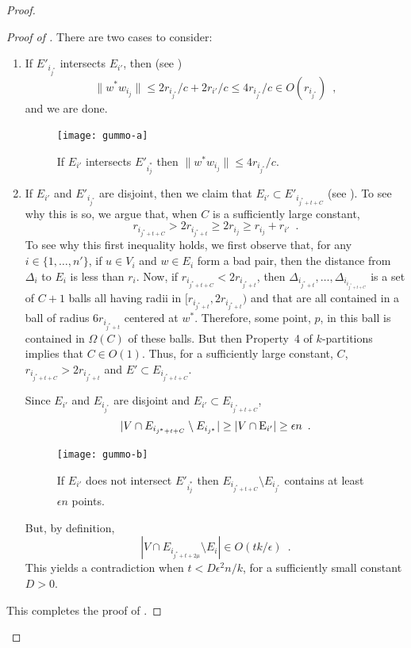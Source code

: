 \documentclass{patmorin}
\begin{document}
\begin{proof}
\begin{proof}[Proof of ]
  There are two cases to consider:
  \begin{enumerate}
    \item 
    If $E'_{i_{j^*}}$ intersects $E_{i'}$, then (see )
    \[
       \|w^*w_{i_j}\|\le 2r_{i_{j^*}}/c + 2r_{i'}/c \le 4r_{i_{j^*}}/c \in O(r_{i_{j^*}}) \enspace ,
    \]
    and we are done. 
    \begin{figure}
      \begin{center}
        \texttt{[image: gummo-a]}
        \caption{If $E_{i'}$ intersects $E'_{i_j^*}$ then $\|w^*w_{i_j}\|\le 4r_{i_{j^*}}/c$.}
      \end{center}
    \end{figure}
  
    \item If $E_{i'}$ and $E'_{i_{j^*}}$ are disjoint, then we claim that
    $E_{i'}\subset E'_{i_{j^*+t+C}}$ (see ).  To see why
    this is so, we argue that, when $C$ is a sufficiently large constant,
    \[
      r_{i_{j^*+t+C}} > 2r_{i_{j^*+t}} 
          \ge 2r_{i_j} \ge r_{i_j} + r_{i'} \enspace .
    \]  
    To see why this first inequality holds, we first observe
    that, for any $i\in\{1,\ldots,n'\}$, if $u\in V_i$ and $w\in E_i$
    form a bad pair, then the distance from $\Delta_i$ to $E_i$ is less
    than $r_i$.  Now, if $r_{i_{j^*+t+C}} < 2r_{i_{j^*+t}}$,
    then $\Delta_{i_{j^*+t}},\ldots,\Delta_{i_{i_{j^*+t+C}}}$ is a set
    of $C+1$ balls all having radii in $[r_{i_{j^*+t}},2r_{i_{j^*+t}})$ and
    that are all contained in a ball of radius $6r_{i_{j^*+t}}$ centered
    at $w^*$.  Therefore, some point, $p$, in this ball is contained in
    $\Omega(C)$ of these balls.  But then Property~4 of $k$-partitions
    implies that $C\in O(1)$.  Thus, for a sufficiently large constant, $C$,
    $r_{i_{j^*+t+C}} > 2r_{i_{j^*+t}}$ and $E'\subset E_{i_{j^*+t+C}}$.

    Since $E_{i'}$ and $E_{i_{j^*}}$ are disjoint and $E_{i'}\subset
    E_{i_{j^*+t+C}}$,
    \[
      |V\cap E_{i_{j^*+t+C}}\setminus E_{i_{j^*}}| 
         \ge |V\cap\mathrm{E}_{i'}| \ge \epsilon n \enspace .
    \]
    \begin{figure}
      \begin{center}
        \texttt{[image: gummo-b]}
        \caption{If $E_{i'}$ does not intersect $E'_{i_j^*}$ then
          $E_{i_{j^*+t+C}}\setminus E_{i_{j^*}}$ contains at least
          $\epsilon n$ points.}
      \end{center}
    \end{figure}
    But, by definition, 
    \[
      |V\cap E_{i_{j^*+t+2\mu}}\setminus E_i| 
         \in O(tk/\epsilon) \enspace .
    \]
    This yields a contradiction when $t<D \epsilon^2 n/k$, for a
    sufficiently small constant $D>0$.
  \end{enumerate}
  This completes the proof of .
  \end{proof}



\end{proof}
\end{document}
